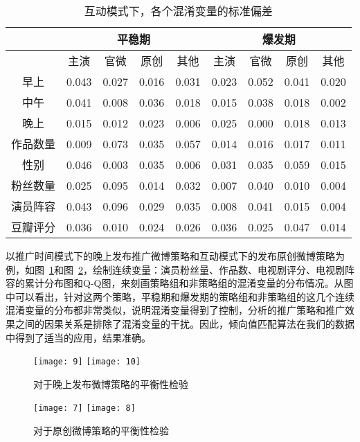 \begin{table}[!htbp]
\centering
\caption{互动模式下，各个混淆变量的标准偏差}
\label{resmutual}
\begin{tabular}{|c|c|c|c|c|c|c|c|c|} \hline
&\multicolumn{4}{c|}{平稳期}& \multicolumn{4}{c|}{爆发期}\\ \hline
&主演&官微& 原创 &其他&主演&官微& 原创 &其他\\ \hline
早上&0.043&0.027& 0.016&0.031&0.023& 0.052&0.041& 0.020\\ \hline
中午&0.041&0.008& 0.036&0.018&0.015& 0.038&0.018& 0.002 \\ \hline
晚上&0.015&0.012& 0.023&0.006&0.025& 0.000&0.018& 0.013\\ \hline
作品数量&0.009&0.073& 0.035&0.057&0.014& 0.016&0.017& 0.011\\ \hline
性别&0.046&0.003& 0.035&0.006&0.031& 0.035&0.059& 0.015\\ \hline
粉丝数量&0.025&0.095& 0.014&0.032&0.007& 0.040&0.010& 0.004\\ \hline
演员阵容&0.043&0.096& 0.029&0.035&0.008& 0.041&0.015& 0.004\\ \hline
豆瓣评分&0.036&0.010& 0.024&0.026&0.036&0.025&0.047& 0.014\\ \hline
\end{tabular}
\end{table}

以推广时间模式下的晚上发布推广微博策略和互动模式下的发布原创微博策略为例，如图~\ref{restime}和图~\ref{res2}，绘制连续变量：演员粉丝量、作品数、电视剧评分、电视剧阵容的累计分布图和Q-Q图，来刻画策略组和非策略组的混淆变量的分布情况。从图中可以看出，针对这两个策略，平稳期和爆发期的策略组和非策略组的这几个连续混淆变量的分布都非常类似，说明混淆变量得到了控制，分析的推广策略和推广效果之间的因果关系是排除了混淆变量的干扰。因此，倾向值匹配算法在我们的数据中得到了适当的应用，结果准确。

\begin{figure}[h]
  \centering%
    {\texttt{[image: 9]}}
    {\texttt{[image: 10]}}
\caption{对于晚上发布微博策略的平衡性检验}
\label{restime}
\end{figure}


\begin{figure}[h]
  \centering%
    {\texttt{[image: 7]}}
    {\texttt{[image: 8]}}
\caption{对于原创微博策略的平衡性检验}
\label{res2}
\end{figure}

